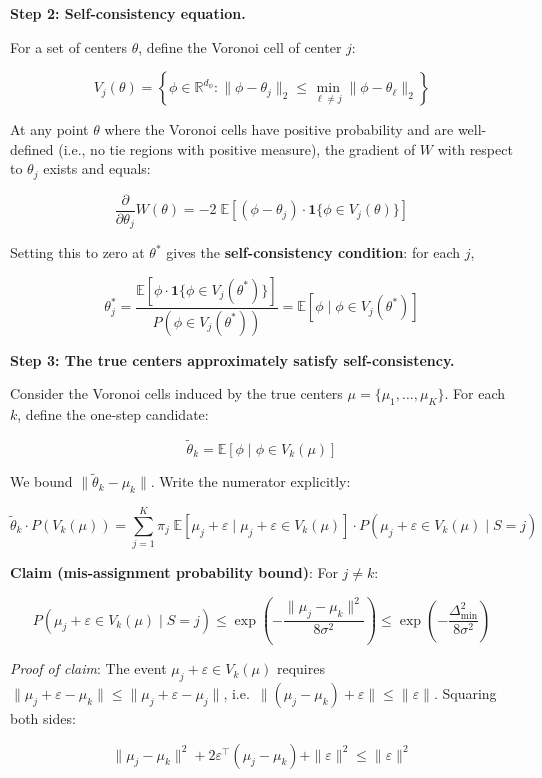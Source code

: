 \documentclass[
  12pt,
]{article}
\begin{document}
\textbf{Step 2: Self-consistency equation.}

For a set of centers \(\theta\), define the Voronoi cell of center
\(j\):

\[V_j(\theta) = \left\{ \phi \in \mathbb{R}^{d_\phi} : \|\phi - \theta_j\|_2 \leq \min_{\ell \neq j} \|\phi - \theta_\ell\|_2 \right\}\]

At any point \(\theta\) where the Voronoi cells have positive
probability and are well-defined (i.e., no tie regions with positive
measure), the gradient of \(W\) with respect to \(\theta_j\) exists and
equals:

\[\frac{\partial}{\partial \theta_j} W(\theta) = -2 \; \mathbb{E}\left[ (\phi - \theta_j) \cdot \mathbf{1}\{\phi \in V_j(\theta)\} \right]\]

Setting this to zero at \(\theta^*\) gives the \textbf{self-consistency
condition}: for each \(j\),

\[\theta^*_j = \frac{\mathbb{E}[\phi \cdot \mathbf{1}\{\phi \in V_j(\theta^*)\}]}{P(\phi \in V_j(\theta^*))} = \mathbb{E}[\phi \mid \phi \in V_j(\theta^*)] \tag{1}\]

\textbf{Step 3: The true centers approximately satisfy
self-consistency.}

Consider the Voronoi cells induced by the true centers
\(\mu = \{\mu_1,\dots,\mu_K\}\). For each \(k\), define the one-step
candidate:

\[\tilde{\theta}_k = \mathbb{E}[\phi \mid \phi \in V_k(\mu)]\]

We bound \(\|\tilde{\theta}_k - \mu_k\|\). Write the numerator
explicitly:

\[\tilde{\theta}_k \cdot P(V_k(\mu)) = \sum_{j=1}^K \pi_j \; \mathbb{E}\left[ \mu_j + \varepsilon \;\big|\; \mu_j + \varepsilon \in V_k(\mu) \right] \cdot P(\mu_j + \varepsilon \in V_k(\mu) \mid S=j)\]

\textbf{Claim (mis-assignment probability bound)}: For \(j \neq k\):

\[P(\mu_j + \varepsilon \in V_k(\mu) \mid S=j) \leq \exp\left(-\frac{\|\mu_j - \mu_k\|^2}{8\sigma^2}\right) \leq \exp\left(-\frac{\Delta_{\min}^2}{8\sigma^2}\right)\]

\emph{Proof of claim}: The event \(\mu_j + \varepsilon \in V_k(\mu)\)
requires
\(\|\mu_j + \varepsilon - \mu_k\| \leq \|\mu_j + \varepsilon - \mu_j\|\),
i.e.~\(\|(\mu_j - \mu_k) + \varepsilon\| \leq \|\varepsilon\|\).
Squaring both sides:

\[\|\mu_j - \mu_k\|^2 + 2\varepsilon^\top(\mu_j - \mu_k) + \|\varepsilon\|^2 \leq \|\varepsilon\|^2\]
\end{document}
